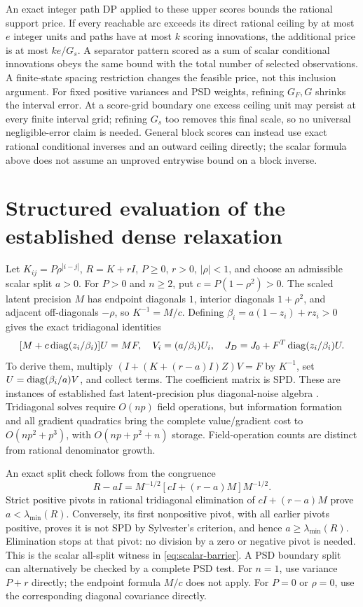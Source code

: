 An exact integer path DP applied to these upper scores bounds the rational
support price. If every reachable arc exceeds its direct rational ceiling
by at most $e$ integer units and paths have at most $k$ scoring innovations,
the additional price is at most $ke/G_s$. A separator pattern scored as a
sum of scalar conditional innovations obeys the same bound with the total
number of selected observations. A finite-state spacing restriction changes
the feasible price, not this inclusion argument. For fixed positive variances
and PSD weights, refining $G_F,G$ shrinks the interval error. At a score-grid
boundary one excess ceiling unit may persist at every finite interval grid;
refining $G_s$ too removes this final scale, so no universal
negligible-error claim is needed. General block scores can instead use exact rational
conditional inverses and an outward ceiling directly; the scalar formula
above does not assume an unproved entrywise bound on a block inverse.

\section{Structured evaluation of the established dense relaxation}
\label{app:dense-oracle}

Let $K_{ij}=P\rho^{|i-j|}$, $R=K+rI$, $P\ge0$, $r>0$,
$|\rho|<1$, and choose an admissible scalar split $a>0$.
For $P>0$ and $n\ge2$, put $c=P(1-\rho^2)>0$. The scaled latent precision
$M$ has endpoint diagonals $1$, interior diagonals $1+\rho^2$, and adjacent
off-diagonals $-\rho$, so $K^{-1}=M/c$. Defining
$\beta_i=a(1-z_i)+rz_i>0$ gives the exact tridiagonal identities
\begin{equation}\label{eq:dense-tridiagonal}
 [M+c\operatorname{diag}(z_i/\beta_i)]U=MF,\quad
 V_i=(a/\beta_i)U_i,\quad
 J_D=J_0+F^T\operatorname{diag}(z_i/\beta_i)U.
\end{equation}
To derive them, multiply $(I+(K+(r-a)I)Z)V=F$ by $K^{-1}$,
set $U=\operatorname{diag}(\beta_i/a)V$, and collect terms. The coefficient matrix
is SPD. These are instances of established fast latent-precision plus
diagonal-noise algebra \citep{RybickiPress1995}. Tridiagonal solves require
$O(np)$ field operations, but information formation and all gradient
quadratics bring the complete value/gradient cost to $O(np^2+p^3)$,
with $O(np+p^2+n)$ storage. Field-operation counts are distinct from
rational denominator growth.

An exact split check follows from the congruence
\begin{equation}\label{eq:split-tridiagonal-check}
 R-aI=M^{-1/2}[cI+(r-a)M]M^{-1/2}.
\end{equation}
Strict positive pivots in rational tridiagonal elimination of
$cI+(r-a)M$ prove $a<\lambda_{\min}(R)$. Conversely, its first nonpositive
pivot, with all earlier pivots positive, proves it is not SPD by Sylvester's
criterion, and hence $a\ge\lambda_{\min}(R)$. Elimination stops at that
pivot: no division by a zero or negative pivot is needed. This is the scalar
all-split witness in \eqref{eq:scalar-barrier}. A PSD boundary split can
alternatively be checked by a complete PSD test. For $n=1$, use variance
$P+r$ directly; the endpoint formula $M/c$ does not apply. For $P=0$ or
$\rho=0$, use the corresponding diagonal covariance directly.

